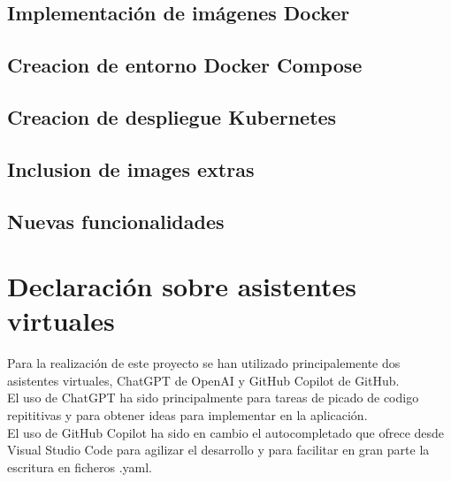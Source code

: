 \documentclass{report}
\begin{document}
        \section{Implementación de imágenes Docker}
            
        \clearpage
        \section{Creacion de entorno Docker Compose}
        \clearpage
        \section{Creacion de despliegue Kubernetes}
        \clearpage
        \section{Inclusion de images extras}
        \clearpage
        \section{Nuevas funcionalidades}
    \chapter{Declaración sobre asistentes virtuales}
        Para la realización de este proyecto se han utilizado principalemente dos asistentes virtuales, ChatGPT de OpenAI y GitHub Copilot de GitHub.\\

        El uso de ChatGPT ha sido principalmente para tareas de picado de codigo repititivas y para obtener ideas para implementar en la aplicación.\\

        El uso de GitHub Copilot ha sido en cambio el autocompletado que ofrece desde Visual Studio Code para agilizar el desarrollo y para facilitar en gran parte la escritura en ficheros .yaml.\\
\end{document}
